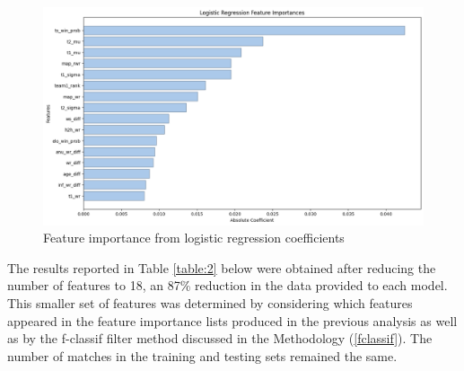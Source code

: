 \begin{figure}[h]
	
	\centering
	\begin{adjustbox}{center} %
		\includegraphics[width=1.3\textwidth]{Figures/logreg-imp.png}
	\end{adjustbox}
	\caption{Feature importance from logistic regression coefficients}
	\label{fig:logimp}
\end{figure}

The results reported in Table \ref{table:2} below were obtained after reducing the number of features to 18, an 87\% reduction in the data provided to each model. This smaller set of features was determined by considering which features appeared in the feature importance lists produced in the previous analysis as well as by the f-classif filter method discussed in the Methodology (\ref{fclassif}). The number of matches in the training and testing sets remained the same.

